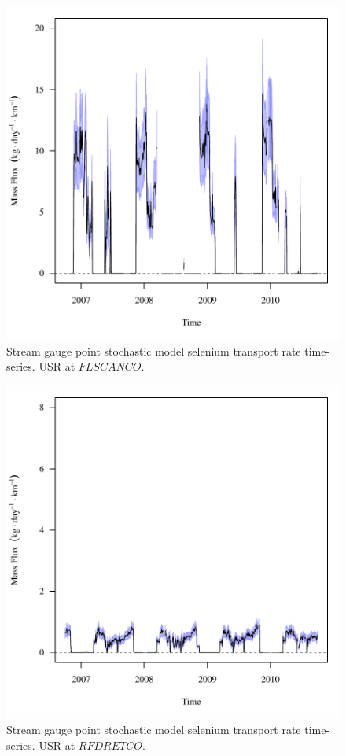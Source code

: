 \begin{figure}[htbp]
	\begin{center}
	\includegraphics[width=6in]{"Figures/Results_USR/f FLS"}
	\caption{Stream gauge point stochastic model selenium transport rate time-series.  USR at $FLSCANCO$.}
	\end{center}
\end{figure}
\newpage

\begin{figure}[htbp]
	\begin{center}
	\includegraphics[width=6in]{"Figures/Results_USR/f RFR"}
	\caption{Stream gauge point stochastic model selenium transport rate time-series.  USR at $RFDRETCO$.}
	\end{center}
\end{figure}
\newpage

